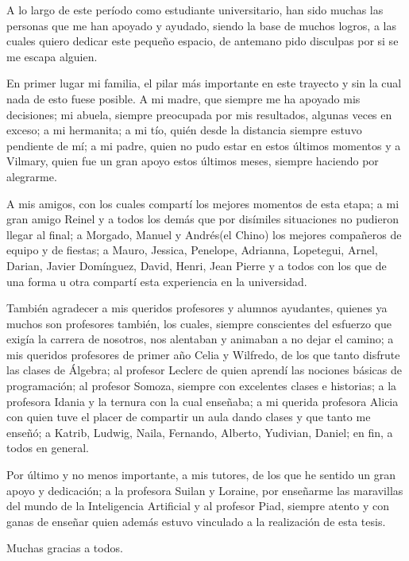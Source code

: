 \begin{acknowledgements}
    A lo largo de este período como estudiante universitario, han sido muchas
    las personas que me han apoyado y ayudado, siendo la base de muchos logros,
    a las cuales quiero dedicar este pequeño espacio, de antemano pido disculpas
    por si se me escapa alguien.
    
    En primer lugar mi familia, el pilar más importante en este trayecto y sin
    la cual nada de esto fuese posible. A mi madre, que siempre me ha apoyado
    mis decisiones; mi abuela, siempre preocupada por mis resultados, algunas
    veces en exceso; a mi hermanita; a mi tío, quién desde la distancia siempre
    estuvo pendiente de mí; a mi padre, quien no pudo estar en estos últimos
    momentos y a Vilmary, quien fue un gran apoyo estos últimos meses, siempre
    haciendo por alegrarme.

    A mis amigos, con los cuales compartí los mejores momentos de esta etapa;
    a mi gran amigo Reinel y a todos los demás que por disímiles situaciones
    no pudieron llegar al final; a Morgado, Manuel y Andrés(el Chino) los
    mejores compañeros de equipo y de fiestas; a Mauro, Jessica, Penelope,
    Adrianna, Lopetegui, Arnel, Darian, Javier Domínguez, David, Henri, Jean
    Pierre y a todos con los que de una forma u otra compartí esta experiencia
    en la universidad.

    También agradecer a mis queridos profesores y alumnos ayudantes, quienes ya
    muchos son profesores también, los cuales, siempre conscientes del esfuerzo
    que exigía la carrera de nosotros, nos alentaban y animaban a no dejar el
    camino; a mis queridos profesores de primer año Celia y Wilfredo, de los
    que tanto disfrute las clases de Álgebra; al profesor Leclerc de quien
    aprendí las nociones básicas de programación; al profesor Somoza, siempre
    con excelentes clases e historias; a la profesora Idania y la ternura con la
    cual enseñaba; a mi querida profesora Alicia con quien tuve el placer de
    compartir un aula dando clases y que tanto me enseñó; a Katrib, Ludwig,
    Naila, Fernando, Alberto, Yudivian, Daniel; en fin, a todos en general.

    Por último y no menos importante, a mis tutores, de los que he sentido un
    gran apoyo y dedicación; a la profesora Suilan y Loraine, por enseñarme
    las maravillas del mundo de la Inteligencia Artificial y al profesor Piad,
    siempre atento y con ganas de enseñar quien además estuvo vinculado a la
    realización de esta tesis.

    Muchas gracias a todos.
\end{acknowledgements}